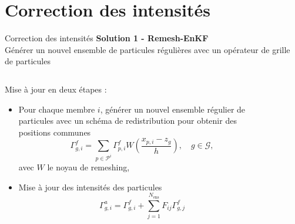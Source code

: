 \documentclass[aspectratio=169]{beamer} %
\begin{document}
\section{Correction des intensités}
\begin{frame}{Correction des intensités}
    \small
    \textbf{Solution 1 - Remesh-EnKF} \\

    Générer un nouvel ensemble de particules régulières avec un opérateur de grille de particules \\

    \begin{columns}
        \begin{column}{0.6\textwidth}
            Mise à jour en deux étapes :
            \begin{itemize}
                \item Pour chaque membre $i$, générer un nouvel ensemble régulier de particules avec un schéma de redistribution pour obtenir des positions communes~\footnotemark[1]
                      \begin{equation*}
                          \Gamma^f_{g, i} = \sum_{p \in \mathcal P^i} \Gamma^f_{p, i} W\left(\frac{x_{p, i} - z_g}{h}\right), \quad g \in \mathcal G,
                      \end{equation*}
                      avec $W$ le noyau de remeshing,
                \item Mise à jour des intensités des particules
                      \begin{equation*}
                          \Gamma^a_{g, i} = \Gamma^f_{g, i} + \sum_{j=1}^{N_{\text{ens}}} F_{ij} \Gamma^f_{g,j}
                      \end{equation*}
            \end{itemize}
        \end{column}
        \hspace{-0.2cm}
        \begin{column}{0.3\textwidth}
            \begin{figure}

\end{figure}
\end{column}
\end{columns}
\end{frame}
\end{document}
